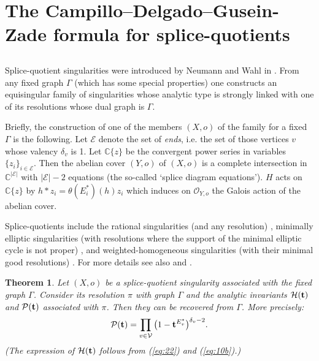 \documentclass[10pt,a4paper]{amsart}
\numberwithin{equation}{section}
\numberwithin{equation}{subsection}
\theoremstyle{plain}
\newtheorem{theorem}[equation]{Theorem}
\theoremstyle{definition}
\begin{document}
\section{The Campillo--Delgado--Gusein-Zade formula for splice-quotients} \label{ss:12}

\subsection{}Splice-quotient singularities were introduced by Neumann
and Wahl in \cite{NWuj2}. From any fixed graph $\Gamma$ (which has
some special properties) one constructs an equisingular family of
singularities whose analytic type is strongly linked with one of
its resolutions whose dual graph is $\Gamma$.

Briefly, the construction of one of the members $(X,o)$ of the
family for a fixed $\Gamma$ is the following.  Let ${\mathcal{E}}$ denote
the set of {\em ends}, i.e. the set of those vertices $v$ whose
valency $\delta_v$ is 1. Let ${\mathbb{C}}\{z\}$ be the convergent power
series in variables $\{z_i\}_{i\in{\mathcal{E}}}$. Then the abelian cover
$(Y,o)$ of $(X,o)$ is a complete intersection in ${\mathbb{C}}^{|{\mathcal{E}}|}$
with $|{\mathcal{E}}|-2$ equations (the so-called `splice diagram
equations'). $H$ acts on ${\mathbb{C}}\{z\}$ by $h*z_i=
\theta(E^*_i)(h)z_i$ which induces on ${\mathcal{O}}_{Y,o}$ the Galois
action of the abelian cover.

Splice-quotients include the rational singularities (and any
resolution) \cite{Ouac-c},  minimally elliptic singularities (with
resolutions where the support of the minimal elliptic  cycle
 is not proper) \cite{Ouac-c}, and weighted-homogeneous singularities
(with their  minimal good resolutions) \cite{Neu}. For more
details see also \cite{NWuj2} and \cite{Opg}.

\begin{theorem}\label{th:21}
Let $(X,o)$ be a splice-quotient singularity associated with the
fixed graph $\Gamma$. Consider its resolution $\pi$ with graph
$\Gamma$ and the analytic invariants ${\mathcal{H}}({{\bf t}})$ and ${\mathcal{P}}({{\bf t}})$
associated with $\pi$. Then they can be recovered from $\Gamma$.
More precisely:
\begin{equation}\label{eq:22}
{\mathcal{P}}({{\bf t}})=\prod_{v\in{\mathcal{V}}} \big(1-{{\bf t}}^{E_v^*}\big)^{\delta_v-2}.
\end{equation}
(The expression of ${\mathcal{H}}({{\bf t}})$ follows from (\ref{eq:22}) and 
(\ref{eq:10b}).)
\end{theorem}
\end{document}
